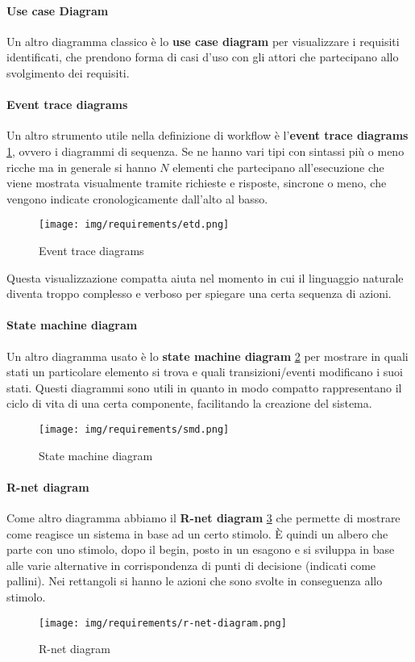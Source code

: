 \paragraph{Use case Diagram}
Un altro diagramma classico è lo \textbf{use case diagram} per visualizzare i
requisiti identificati, che prendono forma di casi d'uso con gli attori che
partecipano allo svolgimento dei requisiti.
\paragraph{Event trace diagrams}
Un altro strumento utile nella definizione di workflow è l'\textbf{event trace
      diagrams} \ref{fig:etd}, ovvero i diagrammi di sequenza. Se ne hanno vari
tipi con sintassi più o meno ricche ma in generale si hanno $N$ elementi che
partecipano all'esecuzione che viene mostrata visualmente tramite richieste e
risposte, sincrone o meno, che vengono indicate cronologicamente dall'alto al basso.
\begin{figure}[!ht]
      \centering
      \texttt{[image: img/requirements/etd.png]}
      \caption{Event trace diagrams}
      \label{fig:etd}
\end{figure}
Questa visualizzazione compatta aiuta nel momento in cui il linguaggio naturale
diventa troppo complesso e verboso per spiegare una certa sequenza di azioni.
\paragraph{State machine diagram}
Un altro diagramma usato è lo \textbf{state machine diagram} \ref{fig:smd} per
mostrare in quali stati un particolare elemento si trova e quali transizioni/eventi
modificano i suoi stati. Questi diagrammi sono utili in quanto in modo compatto
rappresentano il ciclo di vita di una certa componente, facilitando la creazione
del sistema.
\begin{figure}[!ht]
      \centering
      \texttt{[image: img/requirements/smd.png]}
      \caption{State machine diagram}
      \label{fig:smd}
\end{figure}
\paragraph{R-net diagram}
Come altro diagramma abbiamo il \textbf{R-net diagram} \ref{fig:r-net-diagram}
che permette di mostrare come reagisce un sistema in base ad un certo stimolo.
È quindi un albero che parte con uno stimolo, dopo il begin, posto in un esagono
e si sviluppa in base alle varie alternative in corrispondenza di punti di
decisione (indicati come pallini). Nei rettangoli si hanno le azioni che sono
svolte in conseguenza allo stimolo.
\begin{figure}[!ht]
      \centering
      \texttt{[image: img/requirements/r-net-diagram.png]}
      \caption{R-net diagram}
      \label{fig:r-net-diagram}
\end{figure}
